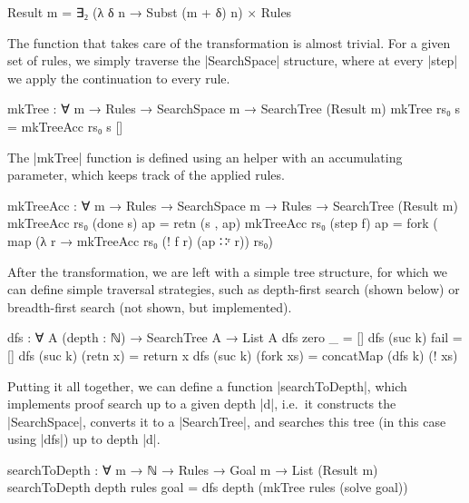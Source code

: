 \documentclass[preprint]{sigplanconf}
\begin{document}
\begin{code}
  Result m = ∃₂ (λ δ n → Subst (m + δ) n) × Rules
\end{code}

The function that takes care of the transformation is almost
trivial. For a given set of rules, we simply traverse the
|SearchSpace| structure, where at every |step| we apply the
continuation to every rule.

\begin{code}
mkTree : ∀ {m} → Rules → SearchSpace m → SearchTree (Result m)
mkTree rs₀ s = mkTreeAcc rs₀ s []
\end{code}

The |mkTree| function is defined using an helper with an accumulating
parameter, which keeps track of the applied rules.

\begin{code}
mkTreeAcc : ∀ {m} → Rules → SearchSpace m → Rules → SearchTree (Result m)
mkTreeAcc rs₀ (done s)  ap  = retn (s , ap)
mkTreeAcc rs₀ (step f)  ap  =
  fork (~ map (λ r → mkTreeAcc rs₀ (! f r) (ap ∷ʳ r)) rs₀)
\end{code}

After the transformation, we are left with a simple tree structure,
for which we can define simple traversal strategies, such as
depth-first search (shown below) or breadth-first search (not shown,
but implemented).

\begin{code}
  dfs : ∀ {A} (depth : ℕ) → SearchTree A → List A
  dfs  zero    _          = []
  dfs (suc k)  fail       = []
  dfs (suc k)  (retn x)   = return x
  dfs (suc k)  (fork xs)  = concatMap (dfs k) (! xs)
\end{code}

Putting it all together, we can define a function |searchToDepth|,
which implements proof search up to a given depth |d|, i.e.\ it
constructs the |SearchSpace|, converts it to a |SearchTree|, and
searches this tree (in this case using |dfs|) up to depth |d|.

\begin{code}
searchToDepth : ∀ {m} → ℕ → Rules → Goal m → List (Result m)
searchToDepth depth rules goal =
  dfs depth (mkTree rules (solve goal))
\end{code}

\end{document}
